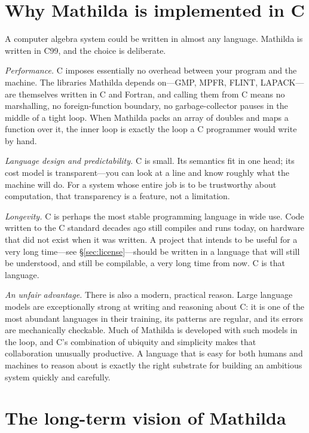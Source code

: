 \section{Why Mathilda is implemented in C}
\label{sec:why-c}

A computer algebra system could be written in almost any language. Mathilda is
written in C99, and the choice is deliberate.

\emph{Performance.} C imposes essentially no overhead between your program and the
machine. The libraries Mathilda depends on---GMP, MPFR, FLINT, LAPACK---are
themselves written in C and Fortran, and calling them from C means no marshalling,
no foreign-function boundary, no garbage-collector pauses in the middle of a tight
loop. When Mathilda packs an array of doubles and maps a function over it, the
inner loop is exactly the loop a C programmer would write by hand.

\emph{Language design and predictability.} C is small. Its semantics fit in one
head; its cost model is transparent---you can look at a line and know roughly what
the machine will do. For a system whose entire job is to be trustworthy about
computation, that transparency is a feature, not a limitation.

\emph{Longevity.} C is perhaps the most stable programming language in wide use.
Code written to the C standard decades ago still compiles and runs today, on
hardware that did not exist when it was written. A project that intends to be
useful for a very long time---see \S\ref{sec:license}---should be written in a
language that will still be understood, and still be compilable, a very long time
from now. C is that language.

\emph{An unfair advantage.} There is also a modern, practical reason. Large
language models are exceptionally strong at writing and reasoning about C: it is
one of the most abundant languages in their training, its patterns are regular,
and its errors are mechanically checkable. Much of Mathilda is developed with such
models in the loop, and C's combination of ubiquity and simplicity makes that
collaboration unusually productive. A language that is easy for both humans and
machines to reason about is exactly the right substrate for building an ambitious
system quickly and carefully.

\section{The long-term vision of Mathilda}
\label{sec:vision}
%

